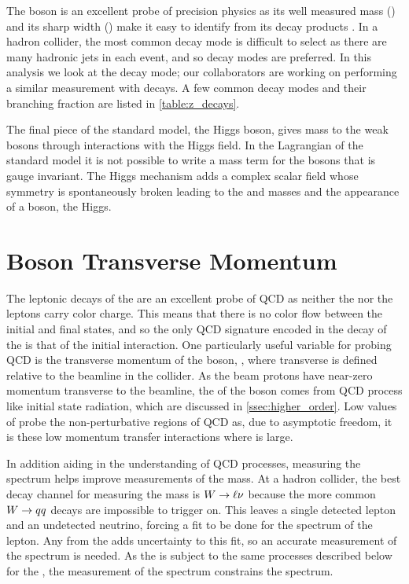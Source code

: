 The \Z boson is an excellent probe of precision physics as its well measured
mass (\Zmass) and its sharp width (\Zwidth) make it easy to identify from its
decay products \cite{pdg2014}. In a hadron collider, the most common \Ztoqq
decay mode is difficult to select as there are many hadronic jets in each
event, and so \Ztoll decay modes are preferred. In this analysis we look at the
\Ztoee decay mode; our collaborators are working on performing a similar
measurement with \Ztomumu decays. A few common decay modes and their branching
fraction are listed in \cref{table:z_decays}.



The final piece of the standard model, the Higgs boson, gives mass to the weak
bosons through interactions with the Higgs field. In the Lagrangian of the
standard model it is not possible to write a mass term for the bosons
that is gauge invariant. The Higgs mechanism adds a complex scalar field whose
symmetry is spontaneously broken leading to the \W and \Z masses and the
appearance of a \spinzero boson, the Higgs.

\section{\texorpdfstring{\Z}{Z} Boson Transverse Momentum}

The leptonic decays of the \Z are an excellent probe of QCD as neither
the \Z nor the leptons carry color charge. This means that there is no color
flow between the initial and final states, and so the only QCD signature
encoded in the decay of the \Z is that of the initial interaction. One
particularly useful variable for probing QCD is the transverse momentum of the
\Z boson, \bosonpt, where transverse is defined relative to the beamline in the
collider. As the beam protons have near-zero momentum transverse to the
beamline, the \bosonpt of the \Z boson comes from QCD process like initial
state radiation, which are discussed in \cref{ssec:higher_order}. Low
values of \bosonpt probe the non-perturbative regions of QCD as, due to
asymptotic freedom, it is these low momentum transfer interactions where
\alphastrong is large.

In addition aiding in the understanding of QCD processes, measuring the \Z
\bosonpt spectrum helps improve measurements of the \W mass. At a hadron
collider, the best decay channel for measuring the \W mass is ${W \to \ell \nu}$ because
the more common ${W \to q q}$ decays are impossible to trigger on. This leaves a
single detected lepton and an undetected neutrino, forcing a fit to be done for
the \pt spectrum of the lepton. Any \bosonpt from the \W adds uncertainty to
this fit, so an accurate measurement of the \W \bosonpt spectrum is needed. As
the \W is subject to the same processes described below for the \Z, the
measurement of the \Z \bosonpt spectrum constrains the \W \bosonpt spectrum.

